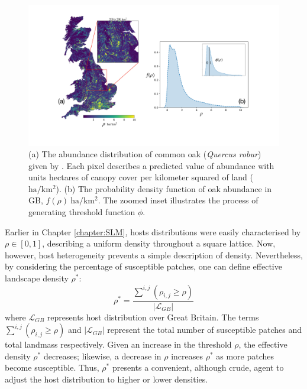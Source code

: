 \newpage

\begin{figure}
    \centering
    \includegraphics[scale=0.32]{chapter4/figures/figure3.pdf}
    \caption{
    (a) The abundance distribution of common oak (\textit{Quercus robur}) given by \cite{hill.data}. Each pixel describes a predicted value of abundance with units hectares of canopy cover per kilometer squared of land ($\mathrm{ha/km^2}$). 
    (b) The probability density function of oak abundance in GB, $f(\rho)\ \mathrm{ha/km^2}$. 
    The zoomed inset illustrates the process of generating threshold function $\phi$.}
    \label{fig:uk-oak-l.hill}
\end{figure}

Earlier in Chapter \ref{chapter:SLM}, hosts distributions were easily characterised by $\rho \in [0, 1]$, 
describing a uniform density throughout a square lattice.
Now, however, host heterogeneity prevents a simple description of density.
Nevertheless, by considering the percentage of susceptible patches,
one can define effective landscape density $\rho^*$:
\begin{equation}
    \label{eq:rho_eff}
  \rho^{*} = \frac{\sum^{i, j} ( \rho_{i,j} \geq \rho )}{|\mathcal{L}_{GB}|}
\end{equation}
where $\mathcal{L}_{GB}$ represents host distribution over Great Britain. 
The terms $\sum^{i, j} (\rho_{i,j} \geq \rho)$ and $|\mathcal{L}_{GB}|$ represent 
the total number of susceptible patches and total landmass respectively. 
Given an increase in the threshold $\rho$, the effective density $\rho^*$ decreases; 
likewise, a decrease in $\rho$ increases $\rho^*$ as more patches become susceptible. 
Thus, $\rho^{*}$ presents a convenient, although crude, agent
to adjust the host distribution to higher or lower densities.

